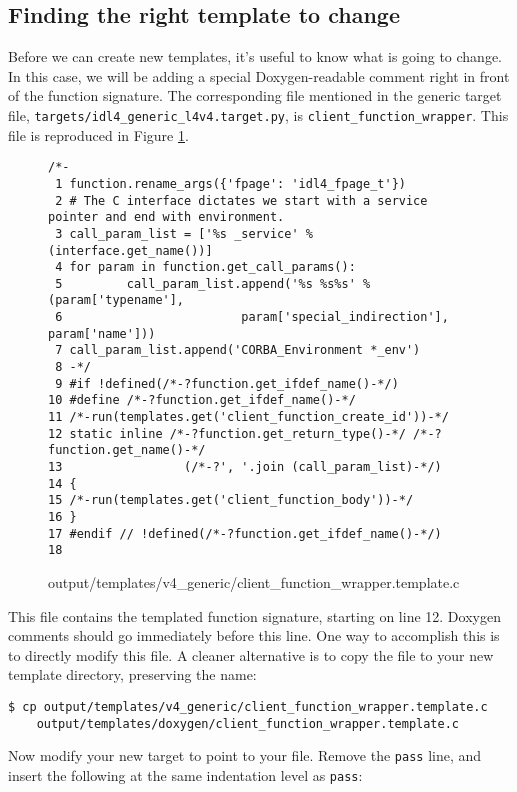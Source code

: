 \subsection{Finding the right template to change}
Before we can create new templates, it's useful to know what is going to change. In this case, we will be adding a special Doxygen-readable comment right in front of the function signature. The corresponding file mentioned in the generic target file, {\tt targets/idl4\_generic\_l4v4.target.py}, is {\tt client\_function\_wrapper}. This file is reproduced in Figure \ref{fig:tut:clientfunctionwrapper}. 

\begin{figure}
\begin{verbatim}
/*-
 1 function.rename_args({'fpage': 'idl4_fpage_t'})
 2 # The C interface dictates we start with a service pointer and end with environment.
 3 call_param_list = ['%s _service' % (interface.get_name())]
 4 for param in function.get_call_params():
 5         call_param_list.append('%s %s%s' % (param['typename'],
 6                         param['special_indirection'], param['name']))
 7 call_param_list.append('CORBA_Environment *_env')
 8 -*/
 9 #if !defined(/*-?function.get_ifdef_name()-*/)
10 #define /*-?function.get_ifdef_name()-*/
11 /*-run(templates.get('client_function_create_id'))-*/
12 static inline /*-?function.get_return_type()-*/ /*-?function.get_name()-*/
13                 (/*-?', '.join (call_param_list)-*/)
14 {
15 /*-run(templates.get('client_function_body'))-*/
16 }
17 #endif // !defined(/*-?function.get_ifdef_name()-*/)
18 \end{verbatim}
\caption{output/templates/v4\_generic/client\_function\_wrapper.template.c}
\label{fig:tut:clientfunctionwrapper}
\end{figure}

This file contains the templated function signature, starting on line 12. Doxygen comments should go immediately before this line. One way to accomplish this is to directly modify this file. A cleaner alternative is to copy the file to your new template directory, preserving the name:

\begin{verbatim}
$ cp output/templates/v4_generic/client_function_wrapper.template.c
    output/templates/doxygen/client_function_wrapper.template.c
\end{verbatim}

Now modify your new target to point to your file. Remove the {\tt pass} line, and insert the following at the same indentation level as {\tt pass}:

